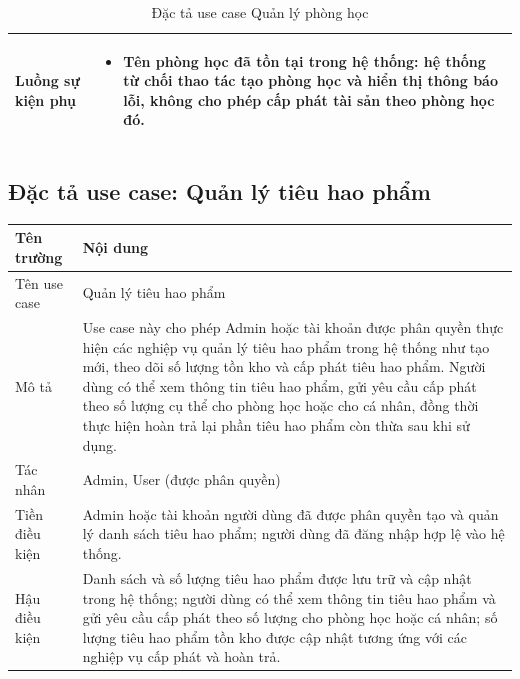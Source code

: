 \documentclass[../DoAn.tex]{subfiles}
\begin{document}
\begin{table}[H]
\begin{tabular}{|p{4cm}|p{11cm}|}
Luồng sự kiện phụ &
\begin{itemize}
    \item Tên phòng học đã tồn tại trong hệ thống: hệ thống từ chối thao tác tạo phòng học và hiển thị thông báo lỗi, không cho phép cấp phát tài sản theo phòng học đó.
\end{itemize} \\
\hline

\end{tabular}
\caption{Đặc tả use case Quản lý phòng học}
\end{table}
\subsection{Đặc tả use case: Quản lý tiêu hao phẩm}

\begin{table}[H]
\centering
\renewcommand{\arraystretch}{1.4}
\begin{tabular}{|p{4cm}|p{11cm}|}
\hline
\textbf{Tên trường} & \textbf{Nội dung} \\
\hline

Tên use case &
Quản lý tiêu hao phẩm \\
\hline

Mô tả &
Use case này cho phép Admin hoặc tài khoản được phân quyền thực hiện các nghiệp vụ quản lý tiêu hao phẩm trong hệ thống như tạo mới, theo dõi số lượng tồn kho và cấp phát tiêu hao phẩm. Người dùng có thể xem thông tin tiêu hao phẩm, gửi yêu cầu cấp phát theo số lượng cụ thể cho phòng học hoặc cho cá nhân, đồng thời thực hiện hoàn trả lại phần tiêu hao phẩm còn thừa sau khi sử dụng. \\
\hline

Tác nhân &
Admin, User (được phân quyền) \\
\hline

Tiền điều kiện &
Admin hoặc tài khoản người dùng đã được phân quyền tạo và quản lý danh sách tiêu hao phẩm; người dùng đã đăng nhập hợp lệ vào hệ thống. \\
\hline

Hậu điều kiện &
Danh sách và số lượng tiêu hao phẩm được lưu trữ và cập nhật trong hệ thống; người dùng có thể xem thông tin tiêu hao phẩm và gửi yêu cầu cấp phát theo số lượng cho phòng học hoặc cá nhân; số lượng tiêu hao phẩm tồn kho được cập nhật tương ứng với các nghiệp vụ cấp phát và hoàn trả. \\
\hline


\end{tabular}
\end{table}
\end{document}
